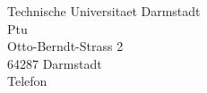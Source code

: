 \vfill
{\renewcommand{\baselinestretch}{1} %
\normalsize %

\begin{minipage}{0.8\textwidth}
	Technische Universitaet Darmstadt\\
	Ptu\\[0.5cm]
%
	Otto-Berndt-Strass 2\\
	64287 Darmstadt\\
	Telefon\\
	
\end{minipage}
\begin{minipage}{0.2\textwidth}
\flushright  %
\ \\[2.7cm]
\SADAlogo\;
\end{minipage}}

